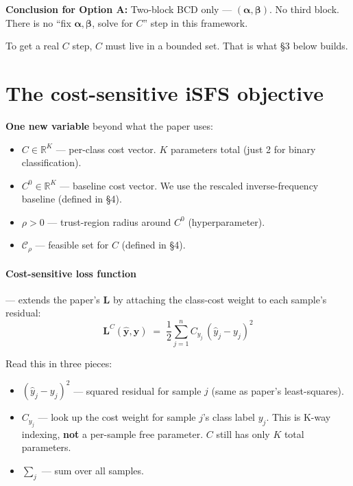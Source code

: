 \documentclass[11pt,a4paper]{article}
\begin{document}
\textbf{Conclusion for Option A:} Two-block BCD only --- $(\boldsymbol{\alpha}, \boldsymbol{\beta})$. No third block. There is no ``fix $\boldsymbol{\alpha}, \boldsymbol{\beta}$, solve for $C$'' step in this framework.

To get a real $C$ step, $C$ must live in a bounded set. That is what \S 3 below builds.

\section{The cost-sensitive iSFS objective}

\textbf{One new variable} beyond what the paper uses:
\begin{itemize}[leftmargin=*,itemsep=2pt]
  \item $C \in \mathbb{R}^K$ --- per-class cost vector. $K$ parameters total (just 2 for binary classification).
  \item $C^0 \in \mathbb{R}^K$ --- baseline cost vector. We use the rescaled inverse-frequency baseline (defined in \S 4).
  \item $\rho > 0$ --- trust-region radius around $C^0$ (hyperparameter).
  \item $\mathcal{C}_\rho$ --- feasible set for $C$ (defined in \S 4).
\end{itemize}

\paragraph{Cost-sensitive loss function} --- extends the paper's $\mathbf{L}$ by attaching the class-cost weight to each sample's residual:
\begin{equation}
\boxed{\;\mathbf{L}^{C}(\hat{\mathbf{y}},\mathbf{y}) \;=\; \frac{1}{2}\sum_{j=1}^{n} C_{y_{j}}\,(\hat{y}_{j} - y_{j})^{2}\;}
\end{equation}

Read this in three pieces:
\begin{itemize}[leftmargin=*,itemsep=2pt]
  \item $(\hat{y}_j - y_j)^2$ --- squared residual for sample $j$ (same as paper's least-squares).
  \item $C_{y_j}$ --- look up the cost weight for sample $j$'s class label $y_j$. This is K-way indexing, \textbf{not} a per-sample free parameter. $C$ still has only $K$ total parameters.
  \item $\sum_j$ --- sum over all samples.
\end{itemize}
\end{document}
